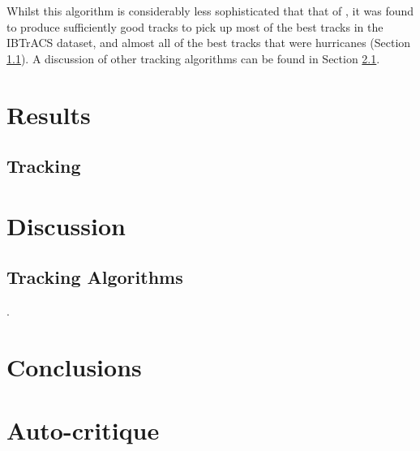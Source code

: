 \documentclass[pdftex,12pt,a4paper]{report}
\begin{document}
Whilst this algorithm is considerably less sophisticated that that of \textcite{hodges1994}, it was found to produce sufficiently good tracks to pick up most of the best tracks in the IBTrACS dataset, and almost all of the best tracks that were hurricanes (Section  \ref{sec:results_tracking}). A discussion of other tracking algorithms can be found in Section \ref{sec:discussion_tracking_algs}.

\chapter{Results}

\section{Tracking}
\label{sec:results_tracking}

\chapter{Discussion}

\section{Tracking Algorithms}
\label{sec:discussion_tracking_algs}.

\chapter{Conclusions}

\chapter*{Auto-critique}

\printbibliography[title={References}]

\end{document}
